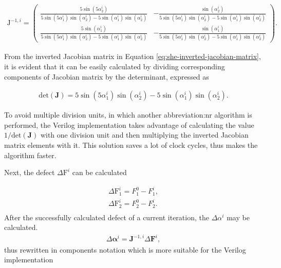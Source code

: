 \documentclass[a4paper, twoside, 11pt]{article}
\begin{document}
        \begin{equation}\label{eq:she-inverted-jacobian-matrix}
            \begin{gathered}
                \mathrm{J}^{-1,i} = 
                \begin{pmatrix}
                \frac{5 \sin(5\alpha_2^i)}{5 \sin(5\alpha_1^i) \sin(\alpha_2^i) - 5 \sin(\alpha_1^i)\sin(\alpha_2^i)} & - \frac{\sin(\alpha_2^i)}{5 \sin(5\alpha_1^i) \sin(\alpha_2^i) - 5 \sin(\alpha_1^i)\sin(\alpha_2^i)}\\
                    \frac{5\sin(\alpha_1^i)}{5 \sin(5\alpha_1^i) \sin(\alpha_2^i) - 5 \sin(\alpha_1^i)\sin(\alpha_2^i)} & - \frac{\sin(\alpha_1^i)}{5 \sin(5\alpha_1^i) \sin(\alpha_2^i) - 5 \sin(\alpha_1^i)\sin(\alpha_2^i)}
                \end{pmatrix}.
            \end{gathered}
        \end{equation}

        \noindent From the inverted Jacobian matrix in Equation \ref{eq:she-inverted-jacobian-matrix}, it is evident that it can be easily calculated by dividing corresponding components of Jacobian matrix by the determinant, expressed as

        \begin{equation}
            \begin{gathered}
                \mathrm{det}(\textbf{J}) = 5 \sin(5\alpha_1^i) \sin(\alpha_2^i) - 5 \sin(\alpha_1^i)\sin(\alpha_2^i).
            \end{gathered}
        \end{equation}
        
        \noindent To avoid multiple division units, in which another \gls{abbreviation:nr} algorithm is performed, the Verilog implementation takes advantage of calculating the value $1/\mathrm{det}(\mathbf{J})$ with one division unit and then multiplying the inverted Jacobian matrix elements with it. This solution saves a lot of clock cycles, thus makes the algorithm faster.\par


        Next, the defect $\Delta \mathrm{F}^i$ can be calculated

        \begin{equation}
            \begin{gathered}
                \Delta \mathrm{F}_1^i = F_1^0 - F_1^i,\\
                \Delta \mathrm{F}_2^i = F_2^0 - F_2^i.\\
            \end{gathered}
        \end{equation}
        After the successfully calculated defect of a current iteration, the $\Delta \alpha^i$ may be calculated.
        \begin{equation}
            \begin{gathered}
                \Delta \boldsymbol{\alpha}^i = \textbf{J}^{-1,i} \Delta \boldsymbol{F}^i,
            \end{gathered}
        \end{equation}
        thus rewritten in components notation which is more suitable for the Verilog implementation
\end{document}
